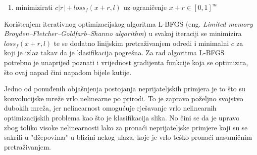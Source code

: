 \documentclass[utf8, diplomski]{fer}
\begin{document}
\begin{enumerate}[noitemsep, label=\textbullet]
  \item minimizirati $c|r| + loss_{f}(x + r, l)$ uz ograničenje $x + r \in [0, 1]^{m}$
\end{enumerate}
Korištenjem iterativnog optimizacijskog algoritma L-BFGS (eng. \textit{Limited memory Broyden–Fletcher–Goldfarb–Shanno algorithm}) u svakoj iteraciji se minimizira $loss_{f}(x + r, l)$ te se dodatno linijskim pretraživanjem odredi i minimalni $c$ za koji je izlaz takav da je klasifikacija pogrešna. Za rad algoritma L-BFGS potrebno je unaprijed poznati i vrijednost gradijenta funkcije koja se optimizira, što ovaj napad čini napadom bijele kutije. \par
Jedno od ponuđenih objašnjenja postojanja neprijateljskih primjera je to što su konvolucijske mreže vrlo nelinearne po prirodi. To je zapravo poželjno svojstvo dubokih mreža, jer nelinearnost omogućuje rješavanje vrlo nelinearnih optimizacijskih problema kao što je klasifikacija slika. No čini se da je upravo zbog toliko visoke nelinearnosti lako za pronaći neprijateljske primjere koji su se sakrili u "džepovima" u blizini nekog ulaza, koje je vrlo teško pronaći nasumičnim pretraživanjem. 
\end{document}
